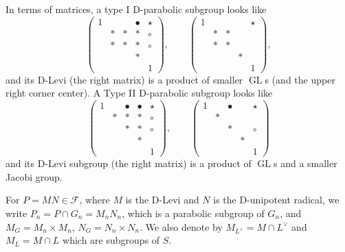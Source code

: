 \documentclass[letterpaper,11pt]{amsart}
\newcommand{\cF}{\mathcal{F}}
\newcommand{\<}{\negthickspace}
\DeclareMathOperator{\GL}{GL}
\theoremstyle{definition}
\theoremstyle{plain}
\theoremstyle{remark}
\numberwithin{equation}{section}
\begin{document}
In terms of matrices, a type I D-parabolic subgroup looks like
    \[
    \begin{pmatrix} 1 & & &\bullet &\star \\
    &*&*&*&\circ\\ &*&*&*&\circ \\
    &&&*& \\ &&&& 1\end{pmatrix}, \qquad
    \begin{pmatrix} 1 & & & &\star \\
    &*&*&&\\ &*&*&& \\
    &&&*& \\ &&&& 1\end{pmatrix},
    \]
and its D-Levi (the right matrix) is a product of smaller $\GL$s (and the upper right corner center). A Type II D-parabolic subgroup looks like
    \[
    \begin{pmatrix} 1 & &\bullet &\bullet &\star \\
    &*&*&*&\circ\\ &&*&*&\circ \\
    &&&*& \\ &&&& 1\end{pmatrix}, \qquad
    \begin{pmatrix} 1 & &\bullet & &\star \\
    &*&&&\\ &&*&& \circ \\
    &&&*& \\ &&&& 1\end{pmatrix}
    \]
and its D-Levi subgroup (the right matrix) is a product of $\GL$s and a smaller Jacobi group. 



For $P = MN \in \cF$, where $M$ is the D-Levi and $N$ is the D-unipotent radical, we write $P_n = P \cap G_n = M_n N_n$, which is a parabolic subgroup of $G_n$, and $M_G = M_n \times M_n$, $N_G = N_n \times N_n$. We also denote by $M_{L^\vee} = M \cap L^\vee$ and $M_{L} = M \cap L$ which are subgroups of $S$.
\end{document}
